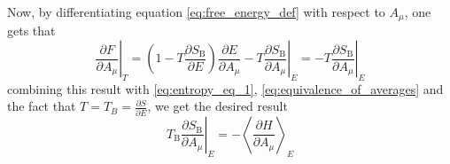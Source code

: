 Now, by differentiating equation \ref{eq:free_energy_def} with respect to $A_{\mu}$, one gets that
\begin{equation*}
    \left.\frac{\partial F}{\partial A_{\mu}}\right|_{T}=\left(1-T \frac{\partial S_{\mathrm{B}}}{\partial E}\right) \frac{\partial E}{\partial A_{\mu}}-\left.T \frac{\partial S_{\mathrm{B}}}{\partial A_{\mu}}\right|_{E} = -\left.T \frac{\partial S_{\mathrm{B}}}{\partial A_{\mu}}\right|_{E}
\end{equation*}
combining this result with \ref{eq:entropy_eq_1}, \ref{eq:equivalence_of_averages} and the fact that $T = T_B = \frac{\partial S}{\partial E}$, we get the desired result
\begin{equation*}
    \left.T_{\mathrm{B}} \frac{\partial S_{\mathrm{B}}}{\partial A_{\mu}}\right|_{E}=-\left\langle\frac{\partial H}{\partial A_{\mu}}\right\rangle_{E}
\end{equation*}